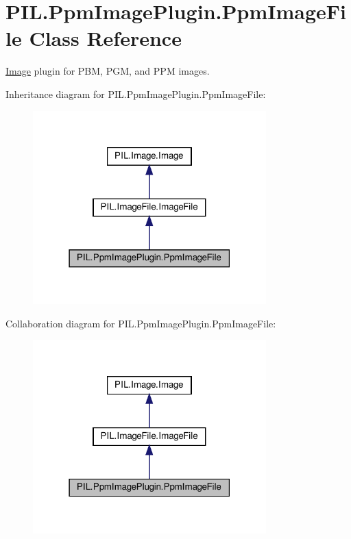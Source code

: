 \hypertarget{classPIL_1_1PpmImagePlugin_1_1PpmImageFile}{}\section{P\+I\+L.\+Ppm\+Image\+Plugin.\+Ppm\+Image\+File Class Reference}
\label{classPIL_1_1PpmImagePlugin_1_1PpmImageFile}


\hyperlink{namespacePIL_1_1Image}{Image} plugin for P\+BM, P\+GM, and P\+PM images.  




Inheritance diagram for P\+I\+L.\+Ppm\+Image\+Plugin.\+Ppm\+Image\+File\+:
\nopagebreak
\begin{figure}[H]
\begin{center}
\leavevmode
\includegraphics[width=255pt]{classPIL_1_1PpmImagePlugin_1_1PpmImageFile__inherit__graph}
\end{center}
\end{figure}


Collaboration diagram for P\+I\+L.\+Ppm\+Image\+Plugin.\+Ppm\+Image\+File\+:
\nopagebreak
\begin{figure}[H]
\begin{center}
\leavevmode
\includegraphics[width=255pt]{classPIL_1_1PpmImagePlugin_1_1PpmImageFile__coll__graph}
\end{center}
\end{figure}
